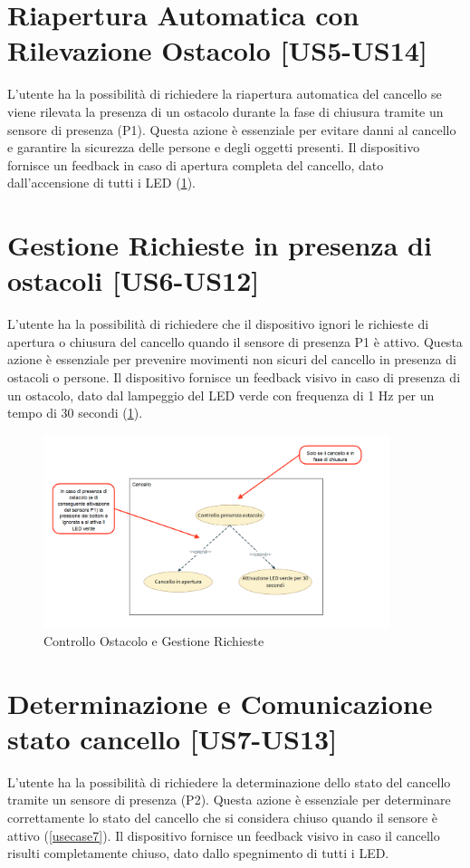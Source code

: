 \section{Riapertura Automatica con Rilevazione Ostacolo [US5-US14]}
L'utente ha la possibilità di richiedere la riapertura automatica del cancello se viene rilevata la presenza di un ostacolo durante la fase di chiusura tramite un sensore di presenza (P1). Questa azione è essenziale per evitare danni al cancello e garantire la sicurezza delle persone e degli oggetti presenti. 
Il dispositivo fornisce un feedback in caso di apertura completa del cancello, dato dall'accensione di tutti i LED (\ref{usecase5}).


\section{Gestione Richieste in presenza di ostacoli [US6-US12]}
L'utente ha la possibilità di richiedere che il dispositivo ignori le richieste di apertura o chiusura del cancello quando il sensore di presenza P1 è attivo. Questa azione è essenziale per prevenire movimenti non sicuri del cancello in presenza di ostacoli o persone.
Il dispositivo fornisce un feedback visivo in caso di presenza di un ostacolo, dato dal lampeggio del LED verde con frequenza di 1 Hz per un tempo di 30 secondi (\ref{usecase5}).


\begin{figure}[H]
    \centering
    \includegraphics[width=0.9\textwidth]{figures/usecase_5.png}
    \caption{Controllo Ostacolo e Gestione Richieste}
    \label{usecase5}
\end{figure}


\section{Determinazione e Comunicazione stato cancello [US7-US13]}
L'utente ha la possibilità di richiedere la determinazione dello stato del cancello tramite un sensore di presenza (P2). Questa azione è essenziale per determinare correttamente lo stato del cancello che si considera chiuso quando il sensore è attivo (\ref{usecase7}). 
Il dispositivo fornisce un feedback visivo in caso il cancello risulti completamente chiuso, dato dallo spegnimento di tutti i LED.

